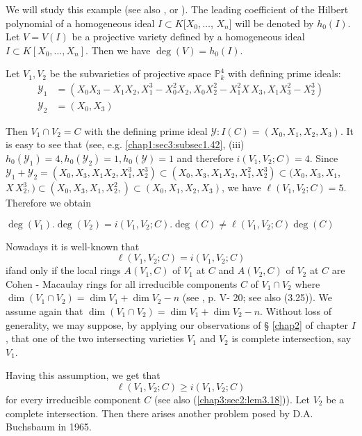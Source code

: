 We will study this example (see also \cite{26}, \cite{50}
or \cite{32}). The 
leading coefficient of the Hilbert polynomial of a homogeneous ideal $I
\subset K [X_0, \ldots$,  $X_n]$ will be denoted by $h_0(I)$. Let $V =
V(I)$ be a projective variety defined by a homogeneous ideal $I
\subset K [X_0, \ldots,  X_n]$. Then we have $\deg (V) = h_0(I)$. 

\setcounter{example}{4}
\begin{example}\label{chap0:sec1:exp0.5}
  Let $V_1, V_2$ be the subvarieties of projective space
  $\mathbb{P}^4_k$ with defining prime ideals: 
  \begin{align*}
    \mathscr{Y}_1 & = (X_0 X_3 -X_1 X_2, X^3_1 - X^2_0 X_2, X_0 X^2_2  -
    X^2_1 X\, X_3, X_1 X^2_3 - X^3_2) \\ 
    \mathscr{Y}_2 & = (X_0, X_3)
  \end{align*}
\end{example}

Then $V_1 \cap V_2 = C$ with the defining prime ideal $\mathscr{Y}:
I(C) = (X_0, X_1, X_2, X_3)$. It is easy to see that (see,
e.g. \ref{chap1:sec3:subsec1.42}, (iii) $h_0 (\mathscr{Y}_1) = 4,
h_0(\mathscr{Y}_2) = 1, 
h_0(\mathscr{Y}) = 1$ and therefore $i (V_1, V_2;C) = 4$. Since
$\mathscr{Y}_1 + \mathscr{Y}_2 = (X_0,X_3,X_1 X_2,X^3_1,X^3_2) \subset
(X_0,X_3,X_1X_2,X^2_1,X^3_2) \subset (X_0,X_3,X_1$, $X\,  X^3_2,) \subset
(X_0,X_3,X_1,X^2_2,) \subset(X_0, X_1, X_2, X_3)$, we have $\ell (V_1,
V_2; C) = 5$. Therefore we obtain 

$\deg (V_1). \deg (V_2) = i(V_1, V_2; C). \deg (C) \neq \ell (V_1,
V_2;C) \deg (C)$ 

Nowadays it is well-known that
$$
\ell (V_1, V_2;C) = i(V_1, V_2;C)
$$
if\pageoriginale and only if the local rings $A(V_1, C)$ of $V_1$ at $C$ and $A(V_2,
C)$ of $V_2$ at $C$ are Cohen - Macaulay rings for all irreducible
components $C$ of $V_1 \cap V_2$ where $\dim (V_1 \cap V_2) = \dim V_1
+ \dim V_2 - n$ (see \cite{72}, p. V- 20; see also (3.25)). We assume
again that $\dim(V_1 \cap V_2)=\dim V_1 + \dim V_2-n$. Without loss of
generality, we may suppose, by applying our observations of \S
 \ref{chap2} 
of chapter $I$, that one of the two intersecting varieties $V_1$ and
$V_2$ is complete intersection, say $V_1$. 

Having this assumption, we get that
$$
\ell(V_1, V_2; C) \ge i(V_1,V_2; C)
$$
for every irreducible component $C$ (see also
(\ref{chap3:sec2:lem3.18})). Let $V_2$ be a 
complete intersection. Then there arises another problem posed by
D.A. Buchsbaum \cite{9} in 1965. 

